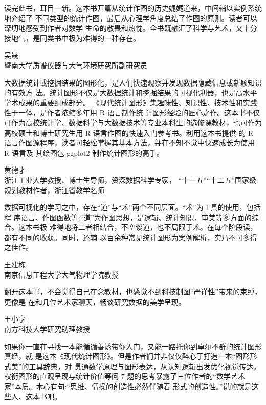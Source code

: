 \documentclass[
  b5paper,
  UTF8,twoside]{book}
\begin{document}
读完此书，耳目一新。这本书开篇从统计作图的历史娓娓道来，中间辅以实例系统地介绍了 不同类型的统计作图，最后从心理学角度总结了作图的原则。读者可以深切地感受到作者对数学 生命的敬畏和热忱。全书既融汇了科学与艺术，又十分接地气，是同类书中极为难得的一种存在。

\begin{flushright}
吴晟\\
暨南大学质谱仪器与大气环境研究所副研究员
\end{flushright}

大数据统计或挖掘结果的图形化，是人们快速观察并发现数据隐藏信息或新颖知识的有效方 法。统计图形不仅是大数据统计和挖掘结果的可视化利器，也是高水平学术成果的重要组成部分。
《现代统计图形》集趣味性、知识性、技术性和实践性于一体，是作者浓缩多年用 R 语言制作统 计图形经验的匠心之作。这本书不仅可作为高校统计学、数据科学与大数据技术等专业本科生的选修课教材，也可作为高校硕士和博士研究生用 R 语言作图的快速入门参考书。利用这本书提供 的 R 语言作图源程序，读者可轻松掌握其基本方法，并在不知不觉中快速成长为使用 R 语言及 其绘图包 ggplot2 制作统计图形的高手。

\begin{flushright}
黄德才\\
浙江工业大学教授、博士生导师，资深数据科学专家，
``十一五''``十二五''国家级规划教材作者，浙江省教学名师
\end{flushright}

数据可视化的学习之中，存在``道''与``术''两个不同层面。``术''为工具的使用，包括程 序语言、作图函数等;``道''为作图思想，是逻辑、统计知识、审美等多方面的综合。这本书极 难得地将二者相结合，不空谈道，也不局限于术。在每个阶段读，都有不同的收获。同时，还辅 以百余种常见统计图形为案例解析，实乃不可多得之佳作。

\begin{flushright}
王建栋\\
南京信息工程大学大气物理学院教授
\end{flushright}

翻开这本书，不会觉得自己在念教材，也感觉不到科技制图``严谨性''带来的束缚，更像是
在和几位艺术家聊天，畅谈研究数据的美学呈现。

\begin{flushright}
王小享\\
南方科技大学研究助理教授
\end{flushright}

如果你一直在寻找一本能循循善诱带你入门，又能一路托你到卓尔不群的统计图形真经，就 是这本《现代统计图形》。但是作者们并非仅仅醉心于打造一本``图形形式美''的工具辞典，对 贯通数学原理与图形表达，从认知逻辑出发优化视觉传达，权衡图形的直观呈现与统计价值等问 7 题的思考暴露了三位作者的``数学艺术家''本质。木心有句:``思维、情操的创造性必然伴随着 形式的创造性。''说的就是这些人、这本书吧。
\end{document}
